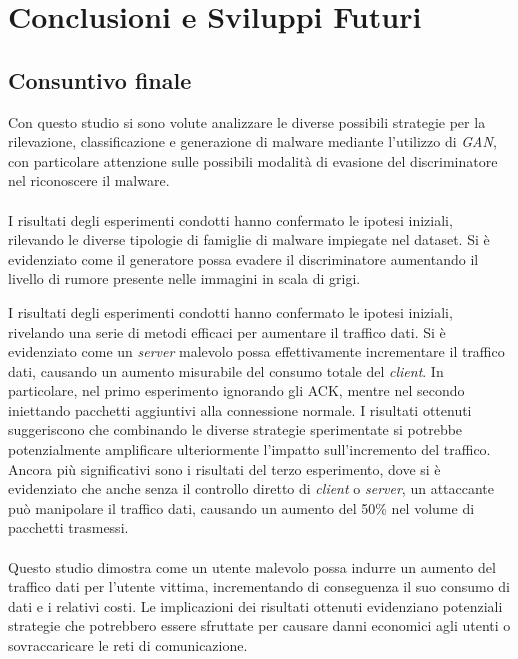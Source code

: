 \chapter{Conclusioni e Sviluppi Futuri}
\label{cap:conclusioni}

\section{Consuntivo finale}
Con questo studio si sono volute analizzare le diverse possibili strategie per la rilevazione, classificazione e generazione di malware mediante l'utilizzo di \emph{GAN}, con particolare attenzione sulle possibili modalità di evasione del discriminatore nel riconoscere il malware.
\\\\
I risultati degli esperimenti condotti hanno confermato le ipotesi iniziali, rilevando le diverse tipologie di famiglie di malware impiegate nel dataset. 
Si è evidenziato come il generatore possa evadere il discriminatore aumentando il livello di rumore presente nelle immagini in scala di grigi. 

I risultati degli esperimenti condotti hanno confermato le ipotesi iniziali, rivelando una serie di metodi efficaci per aumentare il traffico dati. 
Si è evidenziato come un \emph{server} malevolo possa effettivamente incrementare il traffico dati, causando un aumento misurabile del consumo totale del \emph{client}.
In particolare, nel primo esperimento ignorando gli ACK, mentre nel secondo iniettando pacchetti aggiuntivi alla connessione normale. 
I risultati ottenuti suggeriscono che combinando le diverse strategie sperimentate si
potrebbe potenzialmente amplificare ulteriormente l'impatto sull'incremento del traffico. 
Ancora più significativi sono i risultati del terzo esperimento, dove si è evidenziato che anche senza il controllo diretto di \emph{client} o \emph{server}, 
un attaccante può manipolare il traffico dati, causando un aumento del 50\% nel volume di pacchetti trasmessi.
\\\\
Questo studio dimostra come un utente malevolo possa indurre un aumento del traffico dati per l'utente vittima, incrementando di conseguenza il suo consumo di dati e i relativi costi.
Le implicazioni dei risultati ottenuti evidenziano potenziali strategie che potrebbero essere sfruttate per causare danni economici agli utenti o sovraccaricare le reti di comunicazione.
